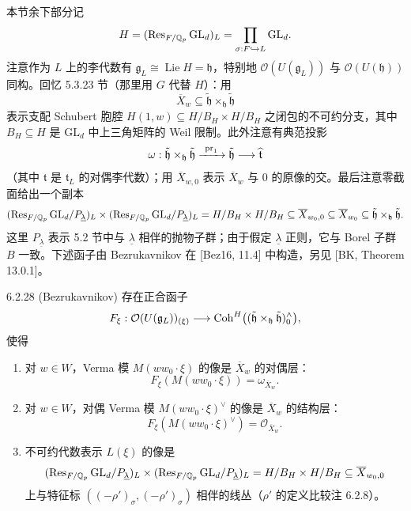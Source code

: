 本节余下部分记
\[
H=(\operatorname{Res}_{F/\mathbb{Q}_p}\mathrm{GL}_d)_L=\prod_{\sigma:F\hookrightarrow L}\mathrm{GL}_d.
\]
注意作为 $L$ 上的李代数有 $\mathfrak g_L\cong\operatorname{Lie}H=\mathfrak h$，特别地 $\mathcal O(U(\mathfrak g_L))$ 与 $\mathcal O(U(\mathfrak h))$ 同构。回忆 5.3.23 节（那里用 $G$ 代替 $H$）：用
\[
\overline{X}_w\subseteq\tilde{\mathfrak h}\times_{\mathfrak h}\tilde{\mathfrak h}
\]
表示支配 Schubert 胞腔 $H(1,w)\subseteq H/B_H\times H/B_H$ 之闭包的不可约分支，其中 $B_H\subseteq H$ 是 $\mathrm{GL}_d$ 中上三角矩阵的 Weil 限制。此外注意有典范投影
\[
\omega:\tilde{\mathfrak h}\times_{\mathfrak h}\tilde{\mathfrak h}
\xrightarrow{\ \mathrm{pr}_1\ }\tilde{\mathfrak h}\longrightarrow\widehat{\mathfrak t}
\]
（其中 $\widehat{\mathfrak t}$ 是 $\mathfrak t_L$ 的对偶李代数）；用 $\overline{X}_{w,0}$ 表示 $\overline{X}_w$ 与 $0$ 的原像的交。最后注意零截面给出一个副本
\[
(\operatorname{Res}_{F/\mathbb{Q}_p}\mathrm{GL}_d/P_{\underline\lambda})_L\times
(\operatorname{Res}_{F/\mathbb{Q}_p}\mathrm{GL}_d/P_{\underline\lambda})_L
=H/B_H\times H/B_H\subseteq\overline{X}_{w_0,0}\subseteq\overline{X}_{w_0}
\subseteq\tilde{\mathfrak h}\times_{\mathfrak h}\tilde{\mathfrak h}.
\]
这里 $P_{\underline\lambda}$ 表示 5.2 节中与 $\underline\lambda$ 相伴的抛物子群；由于假定 $\underline\lambda$ 正则，它与 Borel 子群 $B$ 一致。下述函子由 Bezrukavnikov 在 [Bez16, 11.4] 中构造，另见 [BK, Theorem 13.0.1]。

\begin{thm}{6.2.28 (Bezrukavnikov)}\label{thm:a4-6-2-28}
存在正合函子
\[
F_\xi:\mathcal O(U(\mathfrak g_L))_{(\xi)}\longrightarrow
\operatorname{Coh}^H\bigl((\tilde{\mathfrak h}\times_{\mathfrak h}\tilde{\mathfrak h})^{\wedge}_0\bigr),
\]
使得
\begin{enumerate}[label=(\roman*),leftmargin=2.2em,itemsep=0.15em]
\item 对 $w\in W$，Verma 模 $M(ww_0\cdot\xi)$ 的像是 $\overline{X}_w$ 的对偶层：
\[
F_\xi(M(ww_0\cdot\xi))=\omega_{\overline{X}_w}.
\]
\item 对 $w\in W$，对偶 Verma 模 $M(ww_0\cdot\xi)^\vee$ 的像是 $\overline{X}_w$ 的结构层：
\[
F_\xi(M(ww_0\cdot\xi)^\vee)=\mathcal O_{\overline{X}_w}.
\]
\item 不可约代数表示 $L(\xi)$ 的像是
\[
(\operatorname{Res}_{F/\mathbb{Q}_p}\mathrm{GL}_d/P_{\underline\lambda})_L\times
(\operatorname{Res}_{F/\mathbb{Q}_p}\mathrm{GL}_d/P_{\underline\lambda})_L
=H/B_H\times H/B_H\subseteq\overline{X}_{w_0,0}
\]
上与特征标 $((-\rho')_\sigma,(-\rho')_\sigma)$ 相伴的线丛（$\rho'$ 的定义比较注 6.2.8）。
\end{enumerate}
\end{thm}

